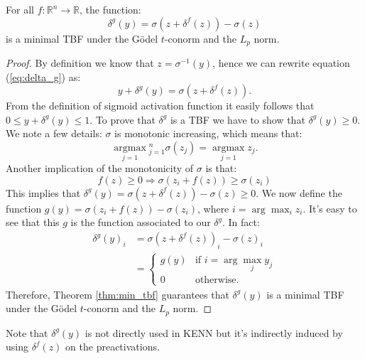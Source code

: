 \begin{theorem}
	For all $f:\mathbb{R}^n\rightarrow\mathbb{R}$, the function:
	\begin{equation}
	\delta^g(y) = \sigma(z+\delta^f(z))-\sigma(z)
	\label{eq:delta_g}
	\end{equation}
	is a minimal TBF under the Gödel $t$-conorm and the $L_p$ norm.
\end{theorem}
\begin{proof}
	By definition we know that $z = \sigma^{-1} (y)$, hence we can rewrite equation (\ref{eq:delta_g}) as:
	$$ y + \delta^g(y) = \sigma(z + \delta^f(z)).$$
	From the definition of sigmoid activation function it easily follows that $0 \leq y + \delta^g(y) \leq 1$. To prove that $\delta^g$ is a TBF we have to show that $\delta^g(y) \geq 0$.
	We note a few details: $\sigma$ is monotonic increasing, which means that:
	$$
	\underset{j=1}{\operatorname{argmax}}{ }_{j=1}^{n} \sigma\left(z_{j}\right)=\underset{j=1}{\operatorname{argmax}} z_{j}.
	$$
	Another implication of the monotonicity of $\sigma$ is that:
	$$
	f(z) \geq 0 \Rightarrow \sigma\left(z_{i}+f(z)\right) \geq \sigma\left(z_{i}\right)
	$$
	This implies that $\delta^g(y)=\sigma(z+\delta^f(z)) - \sigma(z) \geq 0$.
	We now define the function $g(y) = \sigma(z_i + f(z)) - \sigma(z_i)$, where $i = \arg\max_i z_i$. It's easy to see that this $g$ is the function associated to our $\delta^g$. In fact:
	\begin{align*}
	\delta^g(y)_i &= \sigma(z + \delta^f(z))_i - \sigma(z)_i \\
	&=\begin{cases}
	g(y) &\text{if } i=\arg\max_j y_j\\
	0 &\text{otherwise.}
	\end{cases}
	\end{align*}
	Therefore, Theorem \ref{thm:min_tbf} guarantees that $\delta^g(y)$ is a minimal TBF under the Gödel $t$-conorm and the $L_p$ norm.
	
\end{proof}

Note that $\delta^g(y)$ is not directly used in KENN but it's indirectly induced by using $\delta^f(z)$ on the preactivations. 

